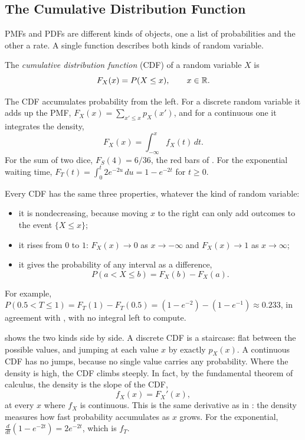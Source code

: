 \subsection{The Cumulative Distribution Function}
\label{sec:ch05-cdf}

PMFs and PDFs are different kinds of objects, one a list of
probabilities and the other a rate. A single function describes both
kinds of random variable.

\begin{definition}
  \label{def:cdf}
  The \emph{cumulative distribution function} (CDF) of a random variable
  $X$ is
  \[
    F_X(x) = P(X \le x), \qquad x \in \mathbb{R} .
  \]
\end{definition}

The CDF accumulates probability from the left. For a discrete random
variable it adds up the PMF, $F_X(x) = \sum_{x' \le x} p_X(x')$, and for
a continuous one it integrates the density,
\[
  F_X(x) = \int_{-\infty}^{x} f_X(t)\, dt .
\]
For the sum of two dice, $F_S(4) = 6/36$, the red bars of
. For the exponential waiting time,
$F_T(t) = \int_0^t 2e^{-2u}\,du = 1 - e^{-2t}$ for $t \ge 0$.

Every CDF has the same three properties, whatever the kind of random
variable:
\begin{itemize}
  \item it is nondecreasing, because moving $x$ to the right can only add
    outcomes to the event $\{X \le x\}$;
  \item it rises from $0$ to $1$: $F_X(x) \to 0$ as $x \to -\infty$ and
    $F_X(x) \to 1$ as $x \to \infty$;
  \item it gives the probability of any interval as a difference,
    \[
      P(a < X \le b) = F_X(b) - F_X(a) .
    \]
\end{itemize}
For example, $P(0.5 < T \le 1) = F_T(1) - F_T(0.5) = (1 - e^{-2}) -
(1 - e^{-1}) \approx 0.233$, in agreement with ,
with no integral left to compute.

 shows the two kinds side by side. A discrete CDF is a
staircase: flat between the possible values, and jumping at each value
$x$ by exactly $p_X(x)$. A continuous CDF has no jumps, because no single
value carries any probability. Where the density is high, the CDF climbs
steeply. In fact, by the fundamental theorem of calculus, the density is
the slope of the CDF,
\[
  f_X(x) = F_X'(x) ,
\]
at every $x$ where $f_X$ is continuous. This is the same derivative as
in : the density measures how fast probability
accumulates as $x$ grows. For the exponential, $\frac{d}{dt}(1 -
e^{-2t}) = 2e^{-2t}$, which is $f_T$.

